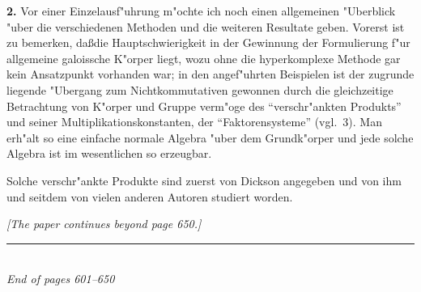 \documentclass[12pt,a4paper]{article}
\theoremstyle{plain}
\begin{document}
\medskip\noindent\textbf{2.}
Vor einer Einzelausf"uhrung m"ochte ich noch einen allgemeinen "Uberblick "uber die verschiedenen Methoden und die weiteren Resultate geben. Vorerst ist zu bemerken, da\ss die Hauptschwierigkeit in der Gewinnung der Formulierung f"ur allgemeine galoissche K"orper liegt, wozu ohne die hyperkomplexe Methode gar kein Ansatzpunkt vorhanden war; in den angef"uhrten Beispielen ist der zugrunde liegende "Ubergang zum Nichtkommutativen gewonnen durch die gleichzeitige Betrachtung von K"orper und Gruppe verm"oge des ``verschr"ankten Produkts'' und seiner Multiplikationskonstanten, der ``Faktorensysteme'' (vgl.\ 3). Man erh"alt so eine einfache normale Algebra "uber dem Grundk"orper und jede solche Algebra ist im wesentlichen so erzeugbar.

Solche verschr"ankte Produkte sind zuerst von Dickson angegeben und von ihm und seitdem von vielen anderen Autoren studiert worden.

\medskip
\hfill\textit{[The paper continues beyond page 650.]}

\vfill
\begin{center}
\rule{0.5\textwidth}{0.4pt}\\[4pt]
\textit{End of pages 601--650}
\end{center}
\end{document}
